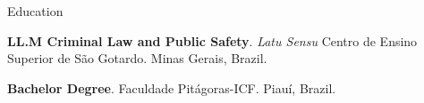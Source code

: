 \begin{rubric}{Education}

\entry*[2021 -- 2022]%
	\textbf{LL.M Criminal Law and Public Safety}. \textit{Latu Sensu} Centro de Ensino Superior de São Gotardo. Minas Gerais, Brazil.

\entry*[2017 -- 2021]%
	\textbf{Bachelor Degree}. Faculdade Pitágoras-ICF. Piauí, Brazil.
\end{rubric}
